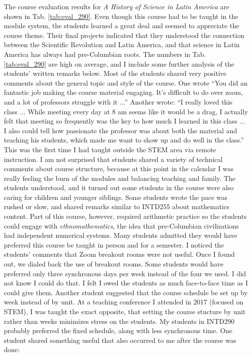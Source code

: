\documentclass[../../../main.tex]{subfiles}
\begin{document}
The course evaluation results for \textit{A History of Science in Latin America} are shown in Tab. \ref{tab:eval_290}.  Even though this course had to be taught in the module system, the students learned a great deal and seemed to appreciate the course theme.  Their final projects indicated that they understood the connection between the Scientific Revolution and Latin America, and that science in Latin America has always had pre-Columbian roots.  The numbers in Tab. \ref{tab:eval_290} are high on average, and I include some further analysis of the students' written remarks below.  Most of the students shared very positive comments about the general topic and style of the course.  One wrote ``You did an fantastic job making the course material engaging. It’s difficult to do over zoom, and a lot of professors struggle with it ...'' Another wrote: ``I really loved this class ... While meeting every day at 8 am seems like it would be a drag, I actually felt that meeting so frequently was the key to how much I learned in this class ... I also could tell how passionate the professor was about both the material and teaching his students, which made me want to show up and do well in the class.''
\\
\vspace{0.25cm}
This was the first time I had taught outside the STEM area via remote instruction.  I am not surprised that students shared a variety of technical comments about course structure, because at this point in the calendar I was really feeling the burn of the modules and balancing teaching and family.  The students understood, and it turned out some students in the course were also caring for children and younger siblings.  Some students wrote the pace was rushed or slow, and shared remarks similar to INTD255 about mathematics content.  Part of this course, however, required arithmetic practice so the students could engage with \textit{ethnomathematics}, the idea that pre-Columbian civilizations had independent numerical systems.  Many students admitted they would have preferred this course be taught in person and for a semester.  I noticed the students' comments that Zoom breakout rooms were not useful.  Once I found out, we dialed back the use of breakout rooms.  Some students would have preferred only three synchronous days per week instead of the four we used.  I did not know I could do that.  I felt I owed the students as much face-to-face time as I could give them.  Another student suggested that the course schedule be set up by week instead of by unit.  At a teaching conference I attended in 2017 (focused on STEM), I was taught the exact opposite, that setting the course stucture by unit rather than weeks minimizes stress on the students.  My students in INTD290 probably preferred the fixed schedule, along with less synchronous time.  One student shared something useful that also occurred to me after the course was done:
\end{document}
